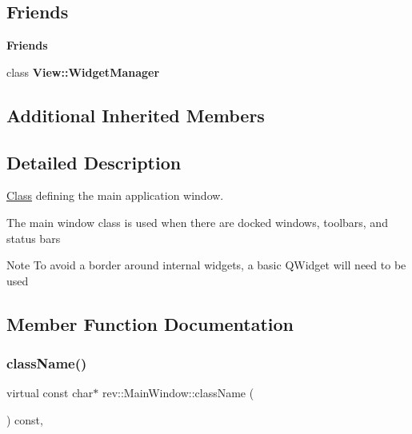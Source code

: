 \subsection*{Friends}
\begin{Indent}\textbf{ Friends}\par
\begin{DoxyCompactItemize}
\item 
\mbox{\label{classrev_1_1_main_window_a1d1f2f187440caa946ea03888dc318f5}} 
class {\bfseries View\+::\+Widget\+Manager}
\end{DoxyCompactItemize}
\end{Indent}
\subsection*{Additional Inherited Members}


\subsection{Detailed Description}
\mbox{\hyperlink{struct_class}{Class}} defining the main application window. 

The main window class is used when there are docked windows, toolbars, and status bars \begin{DoxyNote}{Note}
To avoid a border around internal widgets, a basic Q\+Widget will need to be used 
\end{DoxyNote}


\subsection{Member Function Documentation}
\mbox{\label{classrev_1_1_main_window_a3b8a0c921c8413553567f87a23861ad9}} 
\subsubsection{\texorpdfstring{className()}{className()}}
{\footnotesize\ttfamily virtual const char$\ast$ rev\+::\+Main\+Window\+::class\+Name (\begin{DoxyParamCaption}{ }\end{DoxyParamCaption}) const\hspace{0.3cm}{\ttfamily [inline]}, {\ttfamily [virtual]}}



